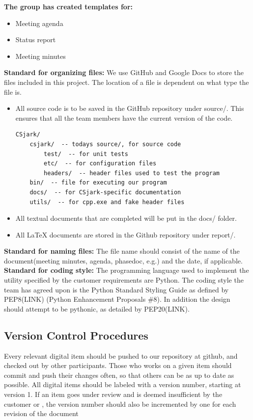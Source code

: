 \textbf{The group has created templates for:}
\begin{itemize}
	\item Meeting agenda
	\item Status report
	\item Meeting minutes
\end{itemize}
\textbf{Standard for organizing files:} \newline
We use GitHub and Google Docs to store the files included in this project. The location of a file is dependent on what type the file is. 
\begin{itemize}
	\item All source code is to be saved in the GitHub repository under source/. This ensures that all the team members have the current version of the code.
		\begin{verbatim}
CSjark/
    csjark/  -- todays source/, for source code
        test/  -- for unit tests
        etc/  -- for configuration files
        headers/  -- header files used to test the program
    bin/  -- file for executing our program
    docs/  -- for CSjark-specific documentation
    utils/  -- for cpp.exe and fake header files
		\end{verbatim}
	\item All textual documents that are completed will be put in the docs/ folder.
	\item All LaTeX documents are stored in the Github repository under report/.
\end{itemize}
\textbf{Standard for naming files:} \newline
The file name should consist of the name of the document(meeting minutes, agenda, phasedoc, e.g.) and the date, if applicable. \newline
\textbf{Standard for coding style:} \newline
The programming language used to implement the utility specified by the customer requirements are Python. The coding style the team has agreed upon is the Python Standard Styling Guide as defined by PEP8(LINK) (Python Enhancement Proposals \#8). In addition the design should attempt to be pythonic, as detailed by PEP20(LINK).

\subsection{Version Control Procedures}
Every relevant digital item should be pushed to our repository at github, and checked out by other participants. Those who works on a given item should commit and push their changes often, so that others can be as up to date as possible. All digital items should be labeled with a version number, starting at version 1. If an item goes under review and is deemed insufficient by the customer or  , the version number should also be incremented by one for each revision of the document

